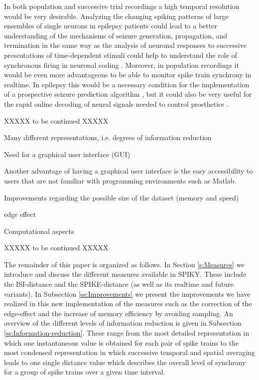\documentclass[10pt,twocolumn]{elsart5p}
\begin{document}
In both population and successive trial recordings a high temporal resolution would be very desirable. Analyzing the changing spiking patterns of large ensembles of single neurons in epilepsy patients could lead to a better understanding of the mechanisms of seizure generation, propagation, and termination \citep{Truccolo11, Bower12} in the same way as the analysis of neuronal responses to successive presentations of time-dependent stimuli could help to understand the role of synchronous firing in neuronal coding \citep{Miller08}. Moreover, in population recordings it would be even more advantageous to be able to monitor spike train synchrony in realtime. In epilepsy this would be a necessary condition for the implementation of a prospective seizure prediction algorithm \citep{Mormann07}, but it could also be very useful for the rapid online decoding of neural signals needed to control prosthetics \citep{Hochberg06, Sanchez08}.

XXXXX to be continued XXXXX

Many different representations, i.e. degrees of information reduction

Need for a graphical user interface (GUI)

Another advantage of having a graphical user interface is the easy accessibility to users that are not familiar with programming environments such as Matlab.

Improvements regarding the possible size of the dataset (memory and speed)

edge effect

Computational aspects

XXXXX to be continued XXXXX

The remainder of this paper is organized as follows. In Section \ref{s:Measures} we introduce and discuss the different measures available in SPIKY. These include the ISI-distance and the SPIKE-distance (as well as its realtime and future variants). In Subsection \ref{ss:Improvements} we present the improvements we have realized in this new implementation of the measures such as the correction of the edge-effect and the increase of memory efficiency by avoiding sampling. An overview of the different levels of information reduction is given in Subsection \ref{ss:Information-reduction}. These range from the most detailed representation in which one instantaneous value is obtained for each pair of spike trains to the most condensed representation in which successive temporal and spatial averaging leads to one single distance value which describes the overall level of synchrony for a group of spike trains over a given time interval.
\end{document}
